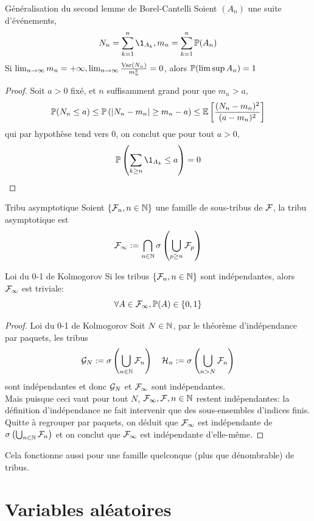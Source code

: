 \documentclass[]{report}
\begin{document}
\begin{tm}{Généralisation du second lemme de Borel-Cantelli}{}
    Soient $(A_n)$ une suite d'événements,
    \[N_n=\sum_{k=1}^{n}\1_{A_k},m_n=\sum_{k=1}^{n}\Pa(A_n)\]
    Si $\lim_{n\to \infty}m_n=+\infty,\lim_{n\to \infty} \frac{\text{Var}(N_n)}{m_n^2}=0$, alors $\mathbb{P}(\limsup A_n)=1$
\end{tm}

\begin{proof}{}{}
    Soit $a>0$ fixé, et $n $ suffisamment grand pour que $m_n>a$,
    \[\mathbb{P}(N_n\le a)\le \mathbb{P}\left(|N_n-m_n|\ge m_n-a\right)\le \mathbb{E}\left[\frac{(N_n-m_n)^2}{(a-m_n)^2}\right]\]
    qui par hypothèse tend vers $0$, on conclut que pour tout $a>0$,
    \[\Pa\left(\sum_{k\ge n} \1_{A_k}\le a\right)=0\]
\end{proof}

\begin{df}{Tribu asymptotique}{}
    Soient $\{\mathcal{F}_n,n\in \mathbb{N}\}$ une famille de sous-tribus de $\mathcal{F}$, la tribu asymptotique est 
    \[\mathcal{F}_\infty:=\bigcap_{n\in\mathbb{N}} \sigma \left(\bigcup_{p\ge n} \mathcal{F}_p\right)\]
\end{df}

\begin{tm}{Loi du 0-1 de Kolmogorov}{}
    Si les tribus $\{\mathcal{F}_n,n\in \mathbb{N}\}$ sont indépendantes, alors $\mathcal{F}_\infty$ est triviale:
    \[\forall A\in \mathcal{F}_\infty,\mathbb{P}(A)\in \{0,1\}\]
\end{tm}

\begin{proof}{Loi du 0-1 de Kolmogorov}{}
    Soit $N\in \mathbb{N}$, par le théorème d'indépendance par paquets, les tribus
    \[\mathcal{G}_N:=\sigma\left(\bigcup_{n\in \mathbb{N}}\mathcal{F}_n\right)\quad \mathcal{H}_n:=\sigma\left(\bigcup_{n>N}\mathcal{F}_n\right)\] sont indépendantes et donc $\mathcal{G}_N$ et $\mathcal{F}_\infty$ sont indépendantes.\\
    Mais puisque ceci vaut pour tout $N$, $\mathcal{F}_\infty,\mathcal{F},n\in \mathbb{N}$ restent indépendantes: la définition d'indépendance ne fait intervenir que des sous-ensembles d'indices finis.\\
    Quitte à regrouper par paquets, on déduit que $\mathcal{F}_\infty$ est indépendante de $\sigma\left(\bigcup_{n\in\mathbb{N}} \mathcal{F}_n\right)$ et on conclut que $\mathcal{F}_\infty$ est indépendante d'elle-même.
\end{proof}

Cela fonctionne aussi pour une famille quelconque (plus que dénombrable) de tribus.

\chapter{Variables aléatoires}
\end{document}
